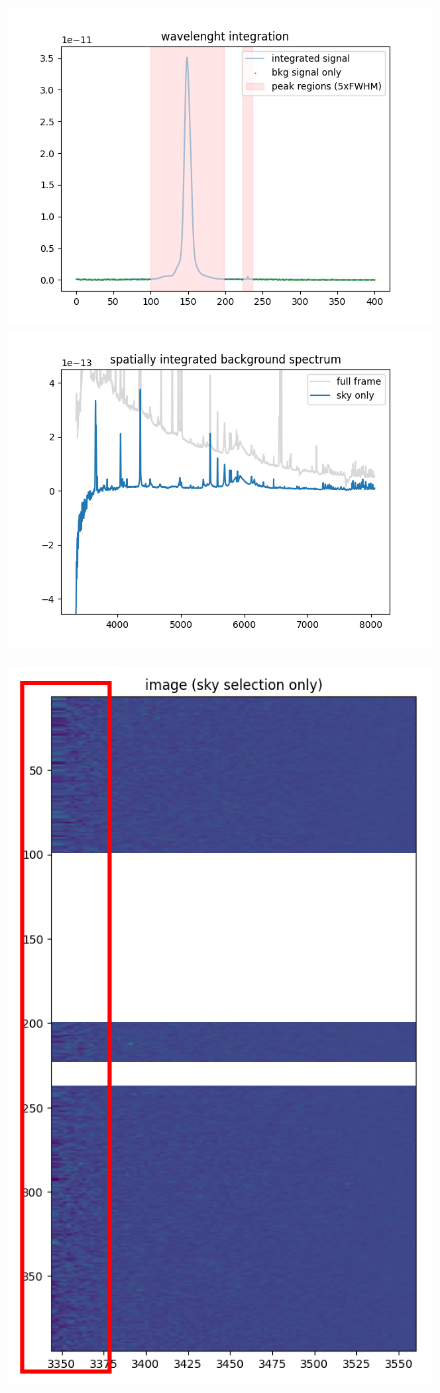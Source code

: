 \documentclass{article}
\begin{document}
\begin{figure}[h!]
	\begin{minipage}{.49\textwidth}
		\centering
		\includegraphics[width=\textwidth]{10_1}
	\end{minipage}
\hfill
	\begin{minipage}{.49\textwidth}
	\centering
	\includegraphics[width=\textwidth]{10_2}
\end{minipage}
\end{figure}
\begin{figure}[h!]
	\centering
	\includegraphics[width=.35\textwidth, angle=90]{10_det}
\end{figure}
\end{document}
